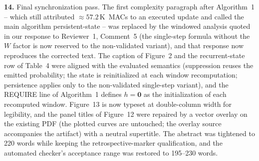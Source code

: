 \documentclass[1p,12pt,authoryear]{elsarticle}
\begin{document}
\vspace{2mm}
\noindent \textbf{14.} Final synchronization pass. The first complexity paragraph after Algorithm~1 -- which still attributed ${\approx}57.2$\,K~MACs to an executed update and called the main algorithm persistent-state -- was replaced by the windowed analysis quoted in our response to Reviewer~1, Comment~5 (the single-step formula without the $W$ factor is now reserved to the non-validated variant), and that response now reproduces the corrected text. The caption of Figure~2 and the recurrent-state row of Table~4 were aligned with the evaluated semantics (suppression reuses the emitted probability; the state is reinitialized at each window recomputation; persistence applies only to the non-validated single-step variant), and the REQUIRE line of Algorithm~1 defines $h{=}\mathbf{0}$ as the initialization of each recomputed window. Figure~13 is now typeset at double-column width for legibility, and the panel titles of Figure~12 were repaired by a vector overlay on the existing PDF (the plotted curves are untouched; the overlay source accompanies the artifact) with a neutral supertitle. The abstract was tightened to 220 words while keeping the retrospective-marker qualification, and the automated checker's acceptance range was restored to 195--230 words.
\end{document}
